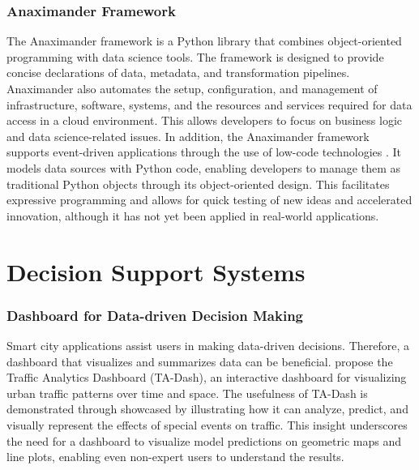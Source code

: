 \subsubsection{Anaximander Framework}
The Anaximander framework is a Python library that combines object-oriented programming with data science tools. The framework is designed to provide concise declarations of data, metadata, and transformation pipelines. Anaximander also automates the setup, configuration, and management of infrastructure, software, systems, and the resources and services required for data access in a cloud environment. This allows developers to focus on business logic and data science-related issues. In addition, the Anaximander framework supports event-driven applications through the use of low-code technologies \citet{jd2021anaximander}. It models data sources with Python code, enabling developers to manage them as traditional Python objects through its object-oriented design. This facilitates expressive programming and allows for quick testing of new ideas and accelerated innovation, although it has not yet been applied in real-world applications.

\section{Decision Support Systems}
\subsubsection{Dashboard for Data-driven Decision Making}
Smart city applications assist users in making data-driven decisions. Therefore, a dashboard that visualizes and summarizes data can be beneficial. \citet{tempelmeier2020ta} propose the Traffic Analytics Dashboard (TA-Dash), an interactive dashboard for visualizing urban traffic patterns over time and space. The usefulness of TA-Dash is demonstrated through showcased by illustrating how it can analyze, predict, and visually represent the effects of special events on traffic. This insight underscores the need for a dashboard to visualize model predictions on geometric maps and line plots, enabling even non-expert users to understand the results.